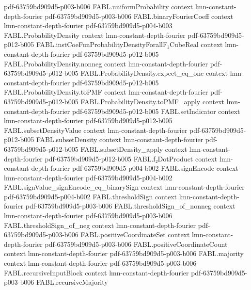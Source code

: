 \begin{theorem}
  {pdf-63759bd909d5-p003-b006}
\proofstep
  {FABL.uniformProbability}
  {context}
  {lmn-constant-depth-fourier}
  {pdf-63759bd909d5-p003-b006}
\proofstep
  {FABL.binaryFourierCoeff}
  {context}
  {lmn-constant-depth-fourier}
  {pdf-63759bd909d5-p004-b003}
\proofstep
  {FABL.ProbabilityDensity}
  {context}
  {lmn-constant-depth-fourier}
  {pdf-63759bd909d5-p012-b005}
\proofstep
  {FABL.instCoeFunProbabilityDensityForallF₂CubeReal}
  {context}
  {lmn-constant-depth-fourier}
  {pdf-63759bd909d5-p012-b005}
\proofstep
  {FABL.ProbabilityDensity.nonneg}
  {context}
  {lmn-constant-depth-fourier}
  {pdf-63759bd909d5-p012-b005}
\proofstep
  {FABL.ProbabilityDensity.expect_eq_one}
  {context}
  {lmn-constant-depth-fourier}
  {pdf-63759bd909d5-p012-b005}
\proofstep
  {FABL.ProbabilityDensity.toPMF}
  {context}
  {lmn-constant-depth-fourier}
  {pdf-63759bd909d5-p012-b005}
\proofstep
  {FABL.ProbabilityDensity.toPMF_apply}
  {context}
  {lmn-constant-depth-fourier}
  {pdf-63759bd909d5-p012-b005}
\proofstep
  {FABL.setIndicator}
  {context}
  {lmn-constant-depth-fourier}
  {pdf-63759bd909d5-p012-b005}
\proofstep
  {FABL.subsetDensityValue}
  {context}
  {lmn-constant-depth-fourier}
  {pdf-63759bd909d5-p012-b005}
\proofstep
  {FABL.subsetDensity}
  {context}
  {lmn-constant-depth-fourier}
  {pdf-63759bd909d5-p012-b005}
\proofstep
  {FABL.subsetDensity_apply}
  {context}
  {lmn-constant-depth-fourier}
  {pdf-63759bd909d5-p012-b005}
\proofstep
  {FABL.f₂DotProduct}
  {context}
  {lmn-constant-depth-fourier}
  {pdf-63759bd909d5-p004-b002}
\proofstep
  {FABL.signEncode}
  {context}
  {lmn-constant-depth-fourier}
  {pdf-63759bd909d5-p004-b002}
\proofstep
  {FABL.signValue_signEncode_eq_binarySign}
  {context}
  {lmn-constant-depth-fourier}
  {pdf-63759bd909d5-p004-b002}
\proofstep
  {FABL.thresholdSign}
  {context}
  {lmn-constant-depth-fourier}
  {pdf-63759bd909d5-p003-b006}
\proofstep
  {FABL.thresholdSign_of_nonneg}
  {context}
  {lmn-constant-depth-fourier}
  {pdf-63759bd909d5-p003-b006}
\proofstep
  {FABL.thresholdSign_of_neg}
  {context}
  {lmn-constant-depth-fourier}
  {pdf-63759bd909d5-p003-b006}
\proofstep
  {FABL.positiveCoordinateSet}
  {context}
  {lmn-constant-depth-fourier}
  {pdf-63759bd909d5-p003-b006}
\proofstep
  {FABL.positiveCoordinateCount}
  {context}
  {lmn-constant-depth-fourier}
  {pdf-63759bd909d5-p003-b006}
\proofstep
  {FABL.majority}
  {context}
  {lmn-constant-depth-fourier}
  {pdf-63759bd909d5-p003-b006}
\proofstep
  {FABL.recursiveInputBlock}
  {context}
  {lmn-constant-depth-fourier}
  {pdf-63759bd909d5-p003-b006}
\proofstep
  {FABL.recursiveMajority}

\end{theorem}
